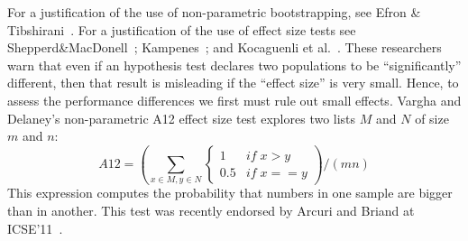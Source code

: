 \documentclass{sig-alternate}
\begin{document}
For a justification of the use of non-parametric
bootstrapping, see Efron \&
Tibshirani~\cite[p220-223]{efron93}.
For a justification of the use of effect size tests
see Shepperd\&MacDonell~\cite{shepperd12a}; Kampenes~\cite{kampenes07}; and
Kocaguenli et al.~\cite{kocharm13}. These researchers
warn that even if an
hypothesis test declares two populations to be
``significantly'' different, then that result is
misleading if the ``effect size'' is very small.
Hence, to assess 
the performance differences 
we first must rule out small effects.
Vargha and Delaney's
non-parametric 
A12 effect size test 
explores
two lists $M$ and $N$ of size $m$ and $n$:
\[A12 = \left(\sum_{x\in M, y \in N} 
\begin{cases} 
1   & \mathit{if}\; x > y\\
0.5 & \mathit{if}\; x == y
\end{cases}\right) / (mn)
\]
This expression computes the probability that numbers in one sample are bigger than in another.
This test was recently 
endorsed by Arcuri and Briand
at ICSE'11~\cite{arcuri11}.
\end{document}
